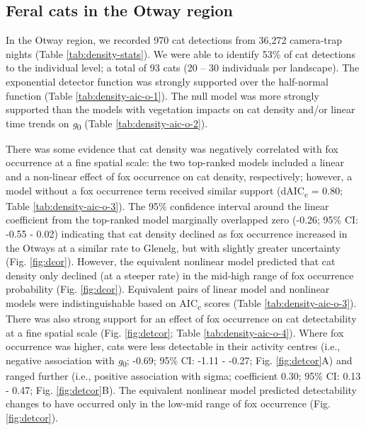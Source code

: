 \documentclass[11pt,a4paper,titlepage,twoside,openright]{style/unimelbthesis}
\begin{document}
\begin{mainmatter}
\hypertarget{feral-cats-in-the-otway-region}{%
\subsection{Feral cats in the Otway region}\label{feral-cats-in-the-otway-region}}

In the Otway region, we recorded 970 cat detections from 36,272 camera-trap nights (Table \ref{tab:density-stats}). We were able to identify 53\% of cat detections to the individual level; a total of 93 cats (20 -- 30 individuals per landscape). The exponential detector function was strongly supported over the half-normal function (Table \ref{tab:density-aic-o-1}). The null model was more strongly supported than the models with vegetation impacts on cat density and/or linear time trends on \emph{g}\textsubscript{0} (Table \ref{tab:density-aic-o-2}).

There was some evidence that cat density was negatively correlated with fox occurrence at a fine spatial scale: the two top-ranked models included a linear and a non-linear effect of fox occurrence on cat density, respectively; however, a model without a fox occurrence term received similar support (dAIC\textsubscript{c} = 0.80; Table \ref{tab:density-aic-o-3}). The 95\% confidence interval around the linear coefficient from the top-ranked model marginally overlapped zero (-0.26; 95\% CI: -0.55 - 0.02) indicating that cat density declined as fox occurrence increased in the Otways at a similar rate to Glenelg, but with slightly greater uncertainty (Fig. \ref{fig:dcor}). However, the equivalent nonlinear model predicted that cat density only declined (at a steeper rate) in the mid-high range of fox occurrence probability (Fig. \ref{fig:dcor}). Equivalent pairs of linear model and nonlinear models were indistinguishable based on AIC\textsubscript{c} scores (Table \ref{tab:density-aic-o-3}).
There was also strong support for an effect of fox occurrence on cat detectability at a fine spatial scale (Fig. \ref{fig:detcor}; Table \ref{tab:density-aic-o-4}). Where fox occurrence was higher, cats were less detectable in their activity centres (i.e., negative association with \emph{g}\textsubscript{0}; -0.69; 95\% CI: -1.11 - -0.27; Fig. \ref{fig:detcor}A) and ranged further (i.e., positive association with sigma; coefficient 0.30; 95\% CI: 0.13 - 0.47; Fig. \ref{fig:detcor}B). The equivalent nonlinear model predicted detectability changes to have occurred only in the low-mid range of fox occurrence (Fig. \ref{fig:detcor}).


\end{mainmatter}
\end{document}
